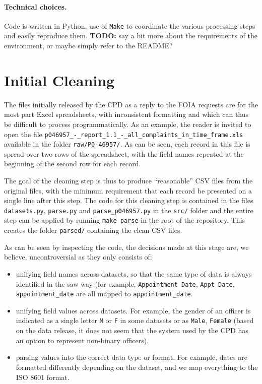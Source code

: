 \documentclass{article}
\begin{document}
\paragraph{Technical choices.} Code is written in Python, use of \texttt{Make}
to coordinate the various processing steps and easily reproduce them.
\textbf{TODO:} say a bit more about the requirements of the environment, or
maybe simply refer to the README?

\section{Initial Cleaning}

The files initially released by the CPD as a reply to the FOIA requests are for
the most part Excel spreadsheets, with inconsistent formatting and which can
thus be difficult to process programmatically. As an example, the reader is
invited to open the file
\texttt{p046957\_-\_report\_1.1\_-\_all\_complaints\_in\_time\_frame.xls}
available in the folder \texttt{raw/P0-46957/}. As can be seen, each record in
this file is spread over two rows of the spreadsheet, with the field names
repeated at the beginning of the second row for each record.

The goal of the cleaning step is thus to produce ``reasonable'' CSV files from
the original files, with the minimum requirement that each record be presented
on a single line after this step. The code for this cleaning step is contained
in the files \texttt{datasets.py}, \texttt{parse.py} and
\texttt{parse\_p046957.py} in the \texttt{src/} folder and the entire step can
be applied by running \texttt{make parse} in the root of the repository. This
creates the folder \texttt{parsed/} containing the clean CSV files.

As can be seen by inspecting the code, the decisions made at this stage are, we
believe, uncontroversial as they only consists of:
\begin{itemize}
	\item unifying field names across datasets, so that the same type of data
		is always identified in the saw way (for example, \texttt{Appointment
		Date}, \texttt{Appt Date}, \texttt{appointment\_date} are all mapped to
		\texttt{appointment\_date}.
	\item unifying field values across datasets. For example, the gender of an
		officer is indicated as a single letter \texttt{M} or \texttt{F} in
		some datasets or as \texttt{Male}, \texttt{Female} (based on the data
		release, it does not seem that the system used by the CPD has an option
		to represent non-binary officers).
	\item parsing values into the correct data type or format. For example,
		dates are formatted differently depending on the dataset, and we map
		everything to the ISO 8601 format.
\end{itemize}
\end{document}
